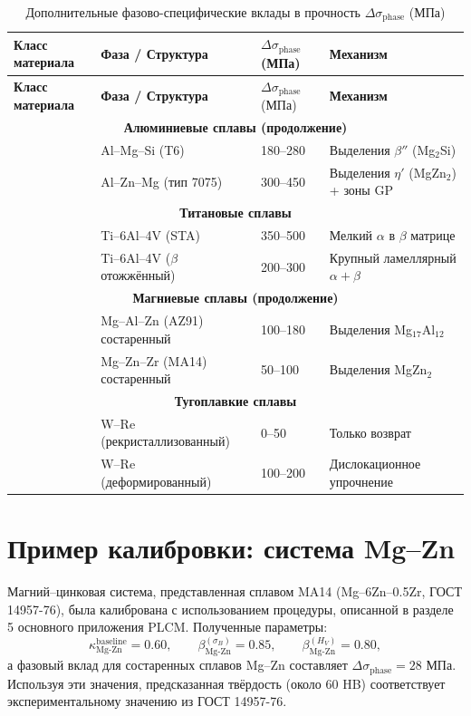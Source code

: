 \documentclass[12pt,a4paper]{article}
\begin{document}
	\begin{longtable}{p{3.5cm} p{3.0cm} p{3.0cm} p{4cm}}
		\caption{Дополнительные фазово-специфические вклады в прочность $\Delta\sigma_{\text{phase}}$ (МПа)}\label{tab:phase_contrib_extended}\\
		\toprule
		\textbf{Класс материала} & \textbf{Фаза / Структура} & $\Delta\sigma_{\text{phase}}$ (МПа) & \textbf{Механизм} \\
		\midrule
		\endfirsthead
		\toprule
		\textbf{Класс материала} & \textbf{Фаза / Структура} & $\Delta\sigma_{\text{phase}}$ (МПа) & \textbf{Механизм} \\
		\midrule
		\endhead
		\multicolumn{4}{c}{\textbf{Алюминиевые сплавы (продолжение)}} \\
		& Al–Mg–Si (T6) & 180–280 & Выделения $\beta''$ (Mg$_2$Si) \\
		& Al–Zn–Mg (тип 7075) & 300–450 & Выделения $\eta'$ (MgZn$_2$) + зоны GP \\
		\hline
		\multicolumn{4}{c}{\textbf{Титановые сплавы}} \\
		& Ti–6Al–4V (STA) & 350–500 & Мелкий $\alpha$ в $\beta$ матрице \\
		& Ti–6Al–4V ($\beta$ отожжённый) & 200–300 & Крупный ламеллярный $\alpha+\beta$ \\
		\hline
		\multicolumn{4}{c}{\textbf{Магниевые сплавы (продолжение)}} \\
		& Mg–Al–Zn (AZ91) состаренный & 100–180 & Выделения Mg$_{17}$Al$_{12}$ \\
		& Mg–Zn–Zr (MA14) состаренный & 50–100 & Выделения MgZn$_2$ \\
		\hline
		\multicolumn{4}{c}{\textbf{Тугоплавкие сплавы}} \\
		& W–Re (рекристаллизованный) & 0–50 & Только возврат \\
		& W–Re (деформированный) & 100–200 & Дислокационное упрочнение \\
		\bottomrule
	\end{longtable}
	
	\section{Пример калибровки: система Mg–Zn}
	Магний–цинковая система, представленная сплавом MA14 (Mg–6Zn–0.5Zr, ГОСТ 14957-76), была калибрована с использованием процедуры, описанной в разделе 5 основного приложения PLCM. Полученные параметры:
	\[
	\kappa_{\text{Mg-Zn}}^{\text{baseline}} = 0.60,\qquad
	\beta_{\text{Mg-Zn}}^{(\sigma_B)} = 0.85,\qquad
	\beta_{\text{Mg-Zn}}^{(H_V)} = 0.80,
	\]
	а фазовый вклад для состаренных сплавов Mg–Zn составляет $\Delta\sigma_{\text{phase}} = 28$ МПа. Используя эти значения, предсказанная твёрдость (около 60 HB) соответствует экспериментальному значению из ГОСТ 14957-76.
	
\end{document}
